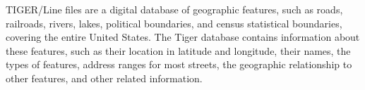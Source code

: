 TIGER/Line files are a digital database of geographic features, such as roads, railroads, rivers, lakes, political boundaries, and census statistical boundaries, covering the entire United States. The Tiger database contains information about these features, such as their location in latitude and longitude, their names, the types of features, address ranges for most streets, the geographic relationship to other features, and other related information.
























